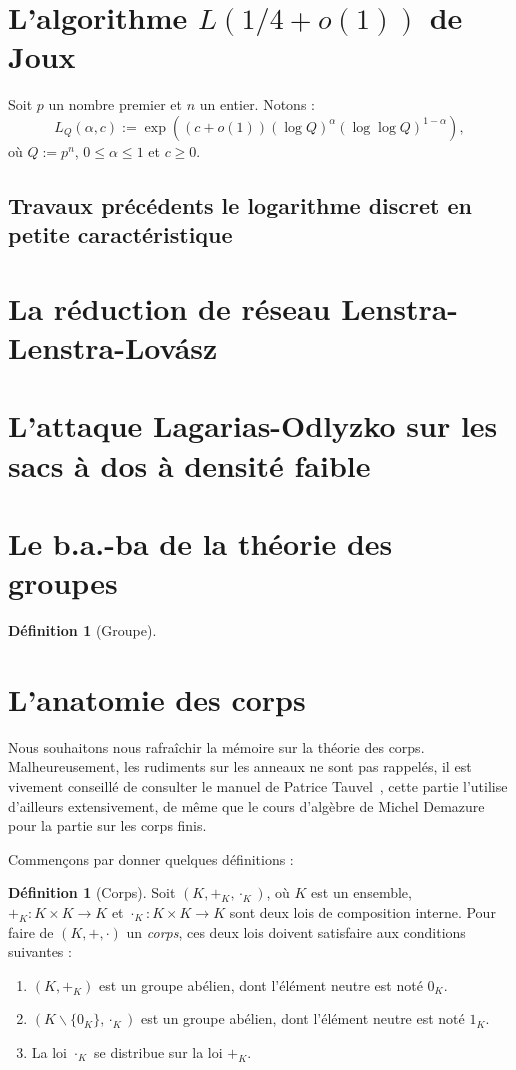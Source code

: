 \documentclass[a4paper, titlepage]{article}
\theoremstyle{definition}
\newtheorem{defi}[theo]{Définition}
\theoremstyle{remark}
\def\o{o}
\begin{document}
\section{L'algorithme $L(1/4 + \o(1))$ de Joux}

Soit $p$ un nombre premier et $n$ un entier. Notons :
$$L_Q(\alpha, c) := \exp\left({(c+\o(1))(\log Q)^\alpha(\log\log Q)^{1 - \alpha}}\right),$$
où $Q:= p^n$, $0 \leqslant \alpha\leqslant 1$ et $c \geqslant 0$.

\subsection{Travaux précédents le logarithme discret en petite caractéristique}


\section{La réduction de réseau Lenstra-Lenstra-Lov\'asz}

\section{L'attaque Lagarias-Odlyzko sur les sacs à dos à densité faible}

\newpage
\appendix

\section{Le b.a.-ba de la théorie des groupes}
\begin{defi}[Groupe]

\end{defi}

\section{L'anatomie des corps}

Nous souhaitons nous rafraîchir la mémoire sur la théorie des corps. Malheureusement, les rudiments sur les anneaux ne sont pas rappelés, il est vivement conseillé de consulter le manuel de Patrice Tauvel~\cite{tauvel2008}, cette partie l'utilise d'ailleurs extensivement, de même que le cours d'algèbre de Michel Demazure~\cite{demazure2008} pour la partie sur les corps finis. 

Commençons par donner quelques définitions :

\begin{defi}[Corps]
Soit $(K,+_K,\cdot_K)$, où $K$ est un ensemble, $+_K : K \times K \rightarrow K$ et $\cdot_K: K \times K \rightarrow K$ sont deux lois de composition interne. Pour faire de $(K,+,\cdot)$ un \textit{corps}, ces deux lois doivent satisfaire aux conditions suivantes : \begin{enumerate}
\item $(K,+_K)$ est un groupe abélien, dont l'élément neutre est noté $0_K$.
\item $(K\backslash \{0_K\},\cdot_K)$ est un groupe abélien, dont l'élément neutre est noté $1_K$.
\item La loi $\cdot_K$ se distribue sur la loi $+_K$.
\end{enumerate}
\end{defi}
\end{document}
